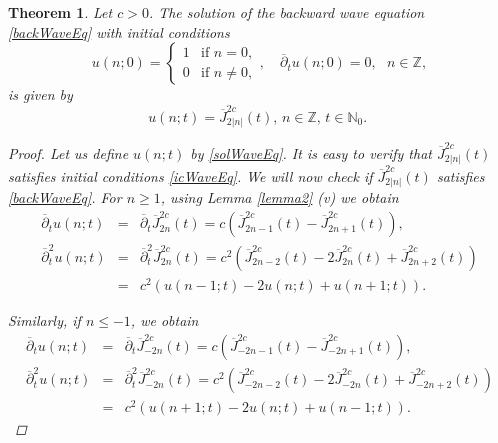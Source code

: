 \documentclass[12pt]{amsart}
\numberwithin{equation}{section}
\newtheorem{theorem}{Theorem}[section]
\begin{document}
\begin{theorem}\label{thm. fund sol}
Let $c>0$. The solution of the backward wave equation \eqref{backWaveEq}
with initial conditions
\begin{equation}
u\left( n;0\right) =\left\{
\begin{array}{ll}
1 & \text{if }n=0, \\
0 & \text{if }n\neq 0,%
\end{array}%
\right. ,\quad \overline{\partial }_{t}u\left( n;0\right) =0,\text{ \ }n\in
\mathbb{Z},  \label{icWaveEq}
\end{equation}
is given by
\begin{equation}
u\left( n;t\right) =\overline{J}_{2\left\vert n\right\vert }^{2c}\left(
t\right) \text{, \ }n\in \mathbb{Z}\text{, \ }t\in \mathbb{N}_{0}\text{.\ }
\label{solWaveEq}
\end{equation}

\begin{proof}
Let us define $u\left( n;t\right) $ by \eqref{solWaveEq}. It is easy to
verify that $\overline{J}_{2\left\vert n\right\vert }^{2c}\left( t\right)$
satisfies initial conditions \eqref{icWaveEq}. We will now check if $%
\overline{J}_{2\left\vert n\right\vert }^{2c}\left( t\right) $ satisfies %
\eqref{backWaveEq}. For $n\geq 1$, using Lemma \ref{lemma2} (v) we obtain%
\begin{eqnarray*}
\overline{\partial }_{t}u\left( n;t\right) &=&\overline{\partial }_{t}%
\overline{J}_{2n}^{2c}\left( t\right) =c\left( \overline{J}%
_{2n-1}^{2c}\left( t\right) -\overline{J}_{2n+1}^{2c}\left( t\right) \right)
, \\
\overline{\partial }_{t}^{2}u\left( n;t\right) &=&\overline{\partial }%
_{t}^{2}\overline{J}_{2n}^{2c}\left( t\right) =c^{2}\left( \overline{J}%
_{2n-2}^{2c}\left( t\right) -2\overline{J}_{2n}^{2c}\left( t\right) +%
\overline{J}_{2n+2}^{2c}\left( t\right) \right) \\
&=&c^{2}\left( u\left( n-1;t\right) -2u\left( n;t\right) +u\left(
n+1;t\right) \right) .
\end{eqnarray*}

Similarly, if $n\leq -1$, we obtain%
\begin{eqnarray*}
\overline{\partial }_{t}u\left( n;t\right) &=&\overline{\partial }_{t}%
\overline{J}_{-2n}^{2c}\left( t\right) =c\left( \overline{J}%
_{-2n-1}^{2c}\left( t\right) -\overline{J}_{-2n+1}^{2c}\left( t\right)
\right) , \\
\overline{\partial }_{t}^{2}u\left( n;t\right) &=&\overline{\partial }%
_{t}^{2}\overline{J}_{-2n}^{2c}\left( t\right) =c^{2}\left( \overline{J}%
_{-2n-2}^{2c}\left( t\right) -2\overline{J}_{-2n}^{2c}\left( t\right) +%
\overline{J}_{-2n+2}^{2c}\left( t\right) \right) \\
&=&c^{2}\left( u\left( n+1;t\right) -2u\left( n;t\right) +u\left(
n-1;t\right) \right) .
\end{eqnarray*}


\end{proof}
\end{theorem}
\end{document}
